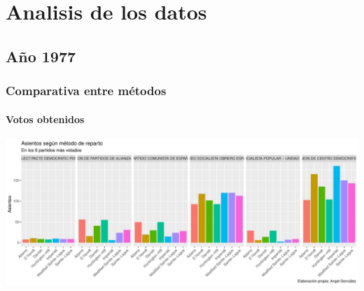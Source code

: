 \documentclass[12pt,a4paper,]{book}
\def\ifdoblecara{} %
\def\ifprincipal{} %
\numberwithin{dummy}{section}
\theoremstyle{ocrenumbox}
\theoremstyle{blacknumex}
\theoremstyle{blacknumbox}
\theoremstyle{ocrenum}
\theoremstyle{ocrenum}
\begin{document}
\FloatBarrier

\ifdefined\ifprincipal
\else
\setlength{\parindent}{1em}
\pagestyle{fancy}
\setcounter{tocdepth}{4}
\tableofcontents

\fi

\ifdefined\ifdoblecara
\fancyhead{}{}
\fancyhead[LE,RO]{\scriptsize\rightmark}
\fancyfoot[LO,RE]{\scriptsize\slshape \leftmark}
\fancyfoot[C]{}
\fancyfoot[LE,RO]{\footnotesize\thepage}
\else
\fancyhead{}{}
\fancyhead[RO]{\scriptsize\rightmark}
\fancyfoot[LO]{\scriptsize\slshape \leftmark}
\fancyfoot[C]{}
\fancyfoot[RO]{\footnotesize\thepage}
\fi
\renewcommand{\headrulewidth}{0.4pt}
\renewcommand{\footrulewidth}{0.4pt}

\hypertarget{analisis-de-los-datos}{%
\chapter{Analisis de los datos}\label{analisis-de-los-datos}}

\hypertarget{auxf1o-1977}{%
\section{Año 1977}\label{auxf1o-1977}}

\hypertarget{comparativa-entre-muxe9todos}{%
\subsection{Comparativa entre
métodos}\label{comparativa-entre-muxe9todos}}

\hypertarget{votos-obtenidos}{%
\subsubsection{Votos obtenidos}\label{votos-obtenidos}}

\begin{center}\includegraphics[width=0.95\linewidth]{figurasR/unnamed-chunk-59-1} \end{center}
\end{document}
